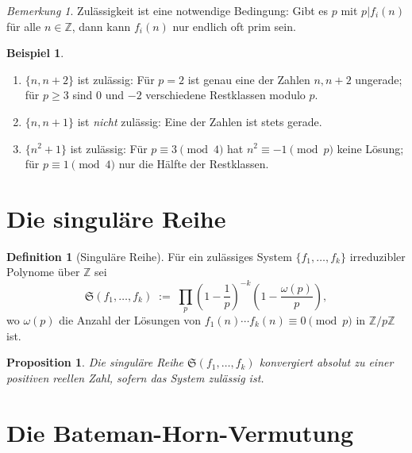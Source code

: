 \documentclass[12pt,a4paper]{amsart}
\newtheorem{proposition}[theorem]{Proposition}
\theoremstyle{definition}
\newtheorem{definition_de}[theorem]{Definition}
\newtheorem{example}[theorem]{Beispiel}
\theoremstyle{remark}
\newtheorem{bemerkung}[theorem]{Bemerkung}
\newcommand{\Z}{\mathbb{Z}}
\newcommand{\BH}{\mathfrak{S}}
\begin{document}
\begin{bemerkung}
  Zulässigkeit ist eine notwendige Bedingung: Gibt es $p$ mit $p | f_i(n)$ für alle
  $n \in \Z$, dann kann $f_i(n)$ nur endlich oft prim sein.
\end{bemerkung}

\begin{example}
  \begin{enumerate}[label=(\roman*)]
    \item $\{n, n+2\}$ ist zulässig: Für $p=2$ ist genau eine der Zahlen $n, n+2$ ungerade;
      für $p\geq 3$ sind $0$ und $-2$ verschiedene Restklassen modulo $p$.
    \item $\{n, n+1\}$ ist \emph{nicht} zulässig: Eine der Zahlen ist stets gerade.
    \item $\{n^2+1\}$ ist zulässig: Für $p \equiv 3 \pmod{4}$ hat $n^2 \equiv -1 \pmod{p}$
      keine Lösung; für $p \equiv 1 \pmod{4}$ nur die Hälfte der Restklassen.
  \end{enumerate}
\end{example}

\section{Die singuläre Reihe}\label{sec:singulaere_reihe}

\begin{definition_de}[Singuläre Reihe]
  Für ein zulässiges System $\{f_1,\ldots,f_k\}$ irreduzibler Polynome über $\Z$ sei
  \[
    \BH(f_1,\ldots,f_k) \;:=\;
    \prod_p \left(1 - \frac{1}{p}\right)^{-k} \left(1 - \frac{\omega(p)}{p}\right),
  \]
  wo $\omega(p)$ die Anzahl der Lösungen von $f_1(n)\cdots f_k(n) \equiv 0 \pmod{p}$
  in $\Z/p\Z$ ist.
\end{definition_de}

\begin{proposition}
  Die singuläre Reihe $\BH(f_1,\ldots,f_k)$ konvergiert absolut zu einer positiven
  reellen Zahl, sofern das System zulässig ist.
\end{proposition}

\section{Die Bateman-Horn-Vermutung}\label{sec:vermutung}
\end{document}
